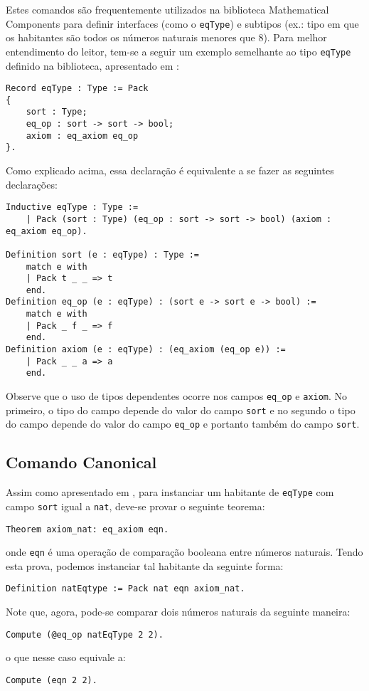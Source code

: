 Estes comandos são frequentemente utilizados na biblioteca Mathematical Components para definir interfaces (como o \lstinline[language = coq]$eqType$) e subtipos (ex.: tipo em que os habitantes são todos os números naturais menores que $8$). Para melhor entendimento do leitor, tem-se a seguir um exemplo semelhante ao tipo \lstinline[language = coq]$eqType$ definido na biblioteca, apresentado em \cite{assia_mahboubi_2022_7118596}:
    \begin{lstlisting}[language=coq,frame=single,tabsize=1]
Record eqType : Type := Pack
{
    sort : Type;
    eq_op : sort -> sort -> bool;
    axiom : eq_axiom eq_op
}.
    \end{lstlisting}
Como explicado acima, essa declaração é equivalente a se fazer as seguintes declarações:
    \begin{lstlisting}[language=coq,frame=single,tabsize=1]
Inductive eqType : Type :=
    | Pack (sort : Type) (eq_op : sort -> sort -> bool) (axiom : eq_axiom eq_op).
    
Definition sort (e : eqType) : Type :=
    match e with
    | Pack t _ _ => t
    end.
Definition eq_op (e : eqType) : (sort e -> sort e -> bool) :=
    match e with
    | Pack _ f _ => f
    end.
Definition axiom (e : eqType) : (eq_axiom (eq_op e)) :=
    | Pack _ _ a => a
    end.
    \end{lstlisting}
Observe que o uso de tipos dependentes ocorre nos campos \lstinline[language = coq]{eq_op} e \lstinline[language = coq]{axiom}. No primeiro, o tipo do campo depende do valor do campo \lstinline[language = coq]{sort} e no segundo o tipo do campo depende do valor do campo \lstinline[language = coq]{eq_op} e portanto também do campo \lstinline[language = coq]{sort}.

\subsection{Comando Canonical} Assim como apresentado em \cite{assia_mahboubi_2022_7118596}, para instanciar um habitante de \lstinline[language = coq]$eqType$ com campo \lstinline[language = coq]$sort$ igual a \lstinline[language = coq]$nat$, deve-se provar o seguinte teorema:
    \begin{lstlisting}[language=coq,frame=single,tabsize=1]
Theorem axiom_nat: eq_axiom eqn.
    \end{lstlisting}
onde \lstinline[language = coq]$eqn$ é uma operação de comparação booleana entre números naturais.
Tendo esta prova, podemos instanciar tal habitante
da seguinte forma:
    \begin{lstlisting}[language=coq,frame=single,tabsize=1]
Definition natEqtype := Pack nat eqn axiom_nat.
    \end{lstlisting}
Note que, agora, pode-se comparar dois números naturais da seguinte maneira:
    \begin{lstlisting}[language=coq,frame=single,tabsize=1]
Compute (@eq_op natEqType 2 2).
    \end{lstlisting}
o que nesse caso equivale a:
    \begin{lstlisting}[language=coq,frame=single,tabsize=1]
Compute (eqn 2 2).
    \end{lstlisting}


